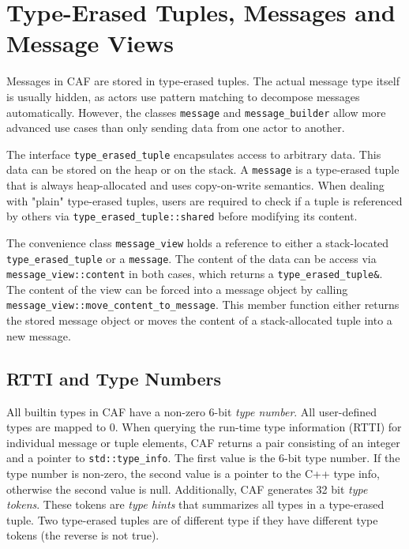 \section{Type-Erased Tuples, Messages and Message Views}
\label{message}

Messages in CAF are stored in type-erased tuples. The actual message type
itself is usually hidden, as actors use pattern matching to decompose messages
automatically. However, the classes \lstinline^message^ and
\lstinline^message_builder^ allow more advanced use cases than only sending
data from one actor to another.

The interface \lstinline^type_erased_tuple^ encapsulates access to arbitrary
data. This data can be stored on the heap or on the stack. A
\lstinline^message^ is a type-erased tuple that is always heap-allocated and
uses copy-on-write semantics. When dealing with "plain" type-erased tuples,
users are required to check if a tuple is referenced by others via
\lstinline^type_erased_tuple::shared^ before modifying its content.

The convenience class \lstinline^message_view^ holds a reference to either a
stack-located \lstinline^type_erased_tuple^ or a \lstinline^message^. The
content of the data can be access via \lstinline^message_view::content^ in both
cases, which returns a \lstinline^type_erased_tuple&^. The content of the view
can be forced into a message object by calling
\lstinline^message_view::move_content_to_message^. This member function either
returns the stored message object or moves the content of a stack-allocated
tuple into a new message.

\subsection{RTTI and Type Numbers}

All builtin types in CAF have a non-zero 6-bit \emph{type number}. All
user-defined types are mapped to 0. When querying the run-time type information
(RTTI) for individual message or tuple elements, CAF returns a pair consisting
of an integer and a pointer to \lstinline^std::type_info^. The first value is
the 6-bit type number. If the type number is non-zero, the second value is a
pointer to the C++ type info, otherwise the second value is null. Additionally,
CAF generates 32 bit \emph{type tokens}. These tokens are \emph{type hints}
that summarizes all types in a type-erased tuple. Two type-erased tuples are of
different type if they have different type tokens (the reverse is not true).

